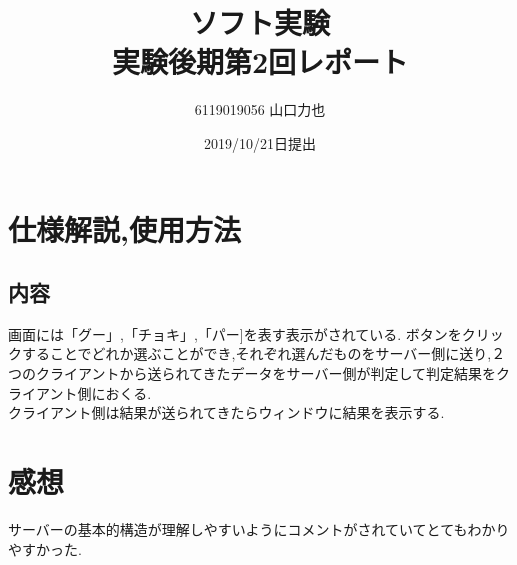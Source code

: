 \documentclass{jarticle}
\title{{ソフト実験}\\実験後期第2回レポート}
\author{6119019056 山口力也}
\date{2019/10/21日提出}
\begin{document}
\maketitle
\section{仕様解説,使用方法}
\subsection{内容}
画面には「グー」,「チョキ」,「パー]を表す表示がされている.
ボタンをクリックすることでどれか選ぶことができ,それぞれ選んだものをサーバー側に送り,２つのクライアントから送られてきたデータをサーバー側が判定して判定結果をクライアント側におくる. \\
クライアント側は結果が送られてきたらウィンドウに結果を表示する.
\subsection{}
\section{感想}
サーバーの基本的構造が理解しやすいようにコメントがされていてとてもわかりやすかった.
\end{document}
